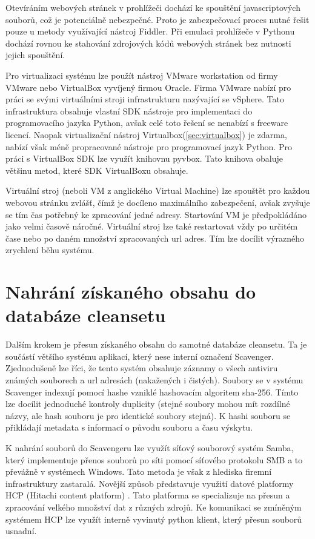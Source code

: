 \documentclass[thesis=M,czech,hidelinks]{FITthesis}[2013/05/06]
\begin{document}
Otevíráním webových stránek v prohlížeči dochází ke spouštění javascriptových souborů, což je potenciálně nebezpečné. Proto je zabezpečovací proces nutné řešit pouze u metody využívající nástroj Fiddler. Při emulaci prohlížeče v Pythonu dochází rovnou ke stahování zdrojových kódů webových stránek bez nutnosti jejich spouštění.

Pro virtualizaci systému lze použít nástroj VMware workstation od firmy VMware nebo VirtualBox vyvíjený firmou Oracle. Firma VMware nabízí pro práci se svými virtuálními stroji infrastrukturu nazývající se vSphere. Tato infrastruktura obsahuje vlastní SDK nástroje pro implementaci do programovacího jazyka Python\cite{vmware}, avšak celé toto řešení se nenabízí s freeware licencí. Naopak virtualizační nástroj Virtualbox(\ref{sec:virtualbox}) je zdarma, nabízí však méně propracované nástroje pro programovací jazyk Python. Pro práci s VirtualBox SDK lze využít knihovnu pyvbox\cite{pyvbox}. Tato knihova obaluje většinu metod, které SDK VirtualBoxu obsahuje. 

Virtuální stroj (neboli VM z anglického Virtual Machine) lze spouštět pro každou webovou stránku zvlášť, čímž je docíleno maximálního zabezpečení, avšak zvyšuje se tím čas potřebný ke zpracování jedné adresy. Startování VM je předpokládáno jako velmi časově náročné.  Virtuální stroj lze také restartovat vždy po určitém čase nebo po daném množství zpracovaných url adres. Tím lze docílit výrazného zrychlení běhu systému.





\section{Nahrání získaného obsahu do databáze cleansetu}
Dalším krokem je přesun získaného obsahu do samotné databáze cleansetu. Ta je součástí většího systému aplikací, který nese interní označení Scavenger. Zjednodušeně lze říci, že tento systém obsahuje záznamy o všech antiviru známých souborech a url adresách (nakažených i čistých). Soubory se v systému Scavenger indexují pomocí hashe vzniklé hashovacím algoritem sha-256. Tímto lze docílit jednoduché kontroly duplicity (stejné soubory mohou mít rozdílné názvy, ale hash souboru je pro identické soubory stejná). K hashi souboru se přikládají metadata s informací o původu souboru a času výskytu. 

K nahrání souborů do Scavengeru lze využít síťový souborový systém Samba, který implementuje přenos souborů po síti pomocí síťového protokolu SMB a to převážně v systémech Windows. Tato metoda je však z hlediska firemní infrastruktury zastaralá. Novější způsob představuje využití datové platformy HCP (Hitachi content platform) \cite{hcp}. Tato platforma se specializuje na přesun a zpracování velkého množství dat z různých zdrojů. Ke komunikaci se zmíněným systémem HCP lze využít interně vyvinutý python klient, který přesun souborů usnadní.
\end{document}
